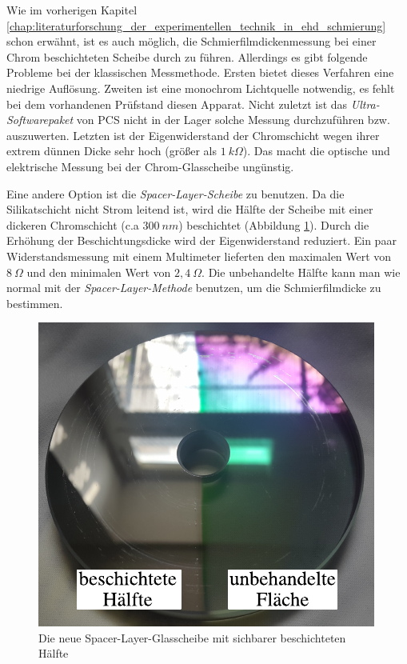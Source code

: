 Wie im vorherigen Kapitel \ref{chap:literaturforschung_der_experimentellen_technik_in_ehd_schmierung} schon erwähnt, ist es auch möglich, die Schmierfilmdickenmessung bei einer Chrom beschichteten Scheibe durch zu führen.
Allerdings es gibt folgende Probleme bei der klassischen Messmethode.
Ersten bietet dieses Verfahren eine niedrige Auflösung. Zweiten ist eine monochrom Lichtquelle notwendig, es fehlt bei dem vorhandenen Prüfstand diesen Apparat.
Nicht zuletzt ist das \textit{Ultra-Softwarepaket} von PCS nicht in der Lager solche Messung durchzuführen bzw. auszuwerten.
Letzten ist der Eigenwiderstand der Chromschicht wegen ihrer extrem dünnen Dicke sehr hoch (größer als $1 \ k\Omega$).
\label{chap:literaturforschung_der_experimentellen_technik_in_ehd_schmierung}
Das macht die optische und elektrische Messung bei der Chrom-Glasscheibe ungünstig.

Eine andere Option ist die \textit{Spacer-Layer-Scheibe} zu benutzen.
Da die Silikatschicht nicht Strom leitend ist, wird die Hälfte der Scheibe mit einer dickeren Chromschicht (c.a $300 \ nm$) beschichtet (Abbildung \ref{fig:die_neu_beschichtet_glassscheibe}).
Durch die Erhöhung der Beschichtungsdicke wird der Eigenwiderstand reduziert.
Ein paar Widerstandsmessung mit einem Multimeter lieferten den maximalen Wert von $8 \ \Omega$ und den minimalen Wert von $2,4 \ \Omega$.
Die unbehandelte Hälfte kann man wie normal mit der \textit{Spacer-Layer-Methode} benutzen, um die Schmierfilmdicke zu bestimmen.
\begin{figure}[htb]
    \centering
    \includegraphics[]{./images/beschichtete_scheibe.pdf}
    \caption{Die neue Spacer-Layer-Glasscheibe mit sichbarer beschichteten Hälfte}
    \label{fig:die_neu_beschichtet_glassscheibe}
\end{figure}
%

